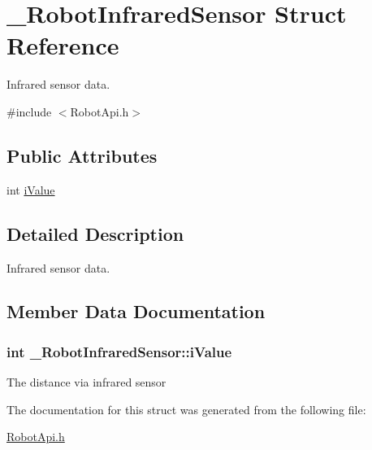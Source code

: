 \hypertarget{struct__RobotInfraredSensor}{\section{\-\_\-\-Robot\-Infrared\-Sensor Struct Reference}
\label{struct__RobotInfraredSensor}
}


Infrared sensor data.  




{\ttfamily \#include $<$Robot\-Api.\-h$>$}

\subsection*{Public Attributes}
\begin{DoxyCompactItemize}
\item 
int \hyperlink{struct__RobotInfraredSensor_adc590c79e4a6f32cc761bb95f6235986}{i\-Value}
\end{DoxyCompactItemize}


\subsection{Detailed Description}
Infrared sensor data. 

\subsection{Member Data Documentation}
\hypertarget{struct__RobotInfraredSensor_adc590c79e4a6f32cc761bb95f6235986}{
\subsubsection[{i\-Value}]{\setlength{\rightskip}{0pt plus 5cm}int \-\_\-\-Robot\-Infrared\-Sensor\-::i\-Value}}\label{struct__RobotInfraredSensor_adc590c79e4a6f32cc761bb95f6235986}
The distance via infrared sensor 

The documentation for this struct was generated from the following file\-:\begin{DoxyCompactItemize}
\item 
\hyperlink{RobotApi_8h}{Robot\-Api.\-h}\end{DoxyCompactItemize}
